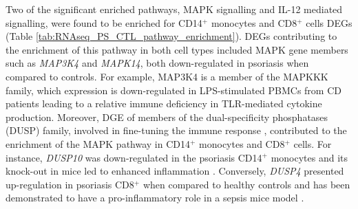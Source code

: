 Two of the significant enriched pathways, MAPK signalling and IL-12 mediated signalling, were found to be enriched for CD14$^+$ monocytes and CD8$^+$ cells DEGs (Table \ref{tab:RNAseq_PS_CTL_pathway_enrichment}). DEGs contributing to the enrichment of this pathway in both cell types included MAPK gene members such as \textit{MAP3K4} and \textit{MAPK14}, both down-regulated in psoriasis when compared to controls. For example, MAP3K4 is a member of the MAPKKK family, which expression is down-regulated in LPS-stimulated PBMCs from CD patients leading to a relative immune deficiency in TLR-mediated cytokine production. Moreover, DGE of members of the dual-specificity phosphatases (DUSP) family, involved in fine-tuning the immune response \parencite{Qian2009}, contributed to the enrichment of the MAPK pathway in CD14$^+$ monocytes and CD8$^+$ cells. For instance, \textit{DUSP10} was down-regulated in the psoriasis CD14$^+$ monocytes and its knock-out in mice led to enhanced inflammation \parencite{Qian2009}. Conversely, \textit{DUSP4} presented up-regulation in psoriasis CD8$^+$ when compared to healthy controls and has been demonstrated to have a pro-inflammatory role in a sepsis mice model \parencite{Cornell2010}.


